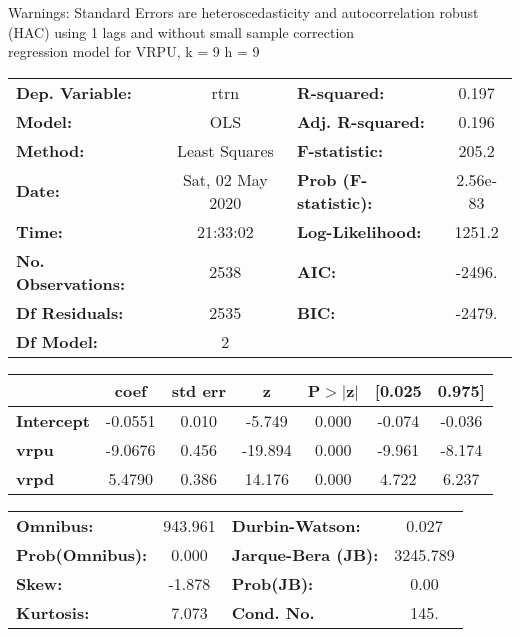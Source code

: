 Warnings: \newline
 [1] Standard Errors are heteroscedasticity and autocorrelation robust (HAC) using 1 lags and without small sample correction\\ 

regression model for VRPU, k = 9 h = 9\begin{center}
\begin{tabular}{lclc}
\toprule
\textbf{Dep. Variable:}    &       rtrn       & \textbf{  R-squared:         } &     0.197   \\
\textbf{Model:}            &       OLS        & \textbf{  Adj. R-squared:    } &     0.196   \\
\textbf{Method:}           &  Least Squares   & \textbf{  F-statistic:       } &     205.2   \\
\textbf{Date:}             & Sat, 02 May 2020 & \textbf{  Prob (F-statistic):} &  2.56e-83   \\
\textbf{Time:}             &     21:33:02     & \textbf{  Log-Likelihood:    } &    1251.2   \\
\textbf{No. Observations:} &        2538      & \textbf{  AIC:               } &    -2496.   \\
\textbf{Df Residuals:}     &        2535      & \textbf{  BIC:               } &    -2479.   \\
\textbf{Df Model:}         &           2      & \textbf{                     } &             \\
\bottomrule
\end{tabular}
\begin{tabular}{lcccccc}
                   & \textbf{coef} & \textbf{std err} & \textbf{z} & \textbf{P$> |$z$|$} & \textbf{[0.025} & \textbf{0.975]}  \\
\midrule
\textbf{Intercept} &      -0.0551  &        0.010     &    -5.749  &         0.000        &       -0.074    &       -0.036     \\
\textbf{vrpu}      &      -9.0676  &        0.456     &   -19.894  &         0.000        &       -9.961    &       -8.174     \\
\textbf{vrpd}      &       5.4790  &        0.386     &    14.176  &         0.000        &        4.722    &        6.237     \\
\bottomrule
\end{tabular}
\begin{tabular}{lclc}
\textbf{Omnibus:}       & 943.961 & \textbf{  Durbin-Watson:     } &    0.027  \\
\textbf{Prob(Omnibus):} &   0.000 & \textbf{  Jarque-Bera (JB):  } & 3245.789  \\
\textbf{Skew:}          &  -1.878 & \textbf{  Prob(JB):          } &     0.00  \\
\textbf{Kurtosis:}      &   7.073 & \textbf{  Cond. No.          } &     145.  \\
\bottomrule
\end{tabular}
\end{center}

